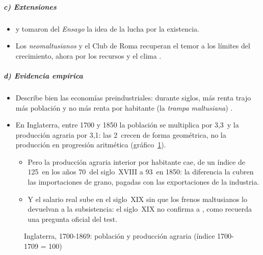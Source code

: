 \documentclass[11pt]{article}
\begin{document}
\subparagraph{c) Extensiones}
\begin{itemize}
\item {} y  tomaron del \emph{Ensayo} la idea de la lucha por la existencia.
\item Los \emph{neomaltusianos} y el Club de Roma recuperan el temor a los límites del crecimiento, ahora por los recursos y el clima .
\end{itemize}

\subparagraph{d) Evidencia empírica}
\begin{itemize}
\item Describe bien las economías preindustriales: durante siglos, más renta trajo más población y no más renta por habitante (la \emph{trampa maltusiana}) .
\item En Inglaterra, entre 1700 y 1850 la población se multiplica por 3,3~y la producción agraria por 3,1: las 2~crecen de forma geométrica, no la producción en progresión aritmética\nocite{BoE2017Millennium,Broadberry2015British} (gráfico~\ref{fig:malthus-datos}).
  \begin{itemize}
  \item Pero la producción agraria interior por habitante cae, de un índice de 125~en los años 70~del siglo~XVIII a 93~en 1850: la diferencia la cubren las importaciones de grano, pagadas con las exportaciones de la industria.
  \item Y el salario real sube en el siglo~XIX sin que los frenos maltusianos lo devuelvan a la subsistencia: el siglo~XIX no confirma a , como recuerda una pregunta oficial del test.
  \end{itemize}
\end{itemize}
\begin{figure}[H]
\centering
\caption{Inglaterra, 1700-1869: población y producción agraria (índice 1700-1709 = 100)}\label{fig:malthus-datos}
\end{figure}
\end{document}
